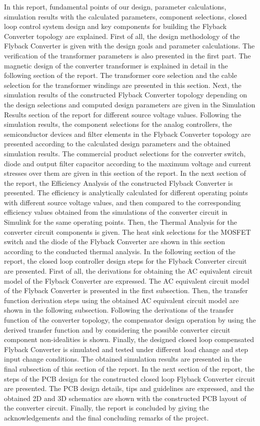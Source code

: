In this report, fundamental points of our design, parameter calculations, simulation results with the calculated parameters, component selections, closed loop control system design and key components for building the Flyback Converter topology are explained. First of all, the design methodology of the Flyback Converter is given with the design goals and parameter calculations. The verification of the transformer parameters is also presented in the first part. The magnetic design of the converter transformer is explained in detail in the following section of the report. The transformer core selection and the cable selection for the transformer windings are presented in this section. Next, the simulation results of the constructed Flyback Converter topology depending on the design selections and computed design parameters are given in the Simulation Results section of the report for different source voltage values. Following the simulation results, the component selections for the analog controllers, the semiconductor devices and filter elements in the Flyback Converter topology are presented according to the calculated design parameters and the obtained simulation results. The commercial product selections for the converter switch, diode and output filter capacitor according to the maximum voltage and current stresses over them are given in this section of the report. In the next section of the report, the Efficiency Analysis of the constructed Flyback Converter is presented. The efficiency is analytically calculated for different operating points with different source voltage values, and then compared to the corresponding efficiency values obtained from the simulations of the converter circuit in Simulink for the same operating points. Then, the Thermal Analysis for the converter circuit components is given. The heat sink selections for the MOSFET switch and the diode of the Flyback Converter are shown in this section according to the conducted thermal analysis. In the following section of the report, the closed loop controller design steps for the Flyback Converter circuit are presented. First of all, the derivations for obtaining the AC equivalent circuit model of the Flyback Converter are expressed. The AC equivalent circuit model of the Flyback Converter is presented in the first subsection. Then, the transfer function derivation steps using the obtained AC equivalent circuit model are shown in the following subsection. Following the derivations of the transfer function of the converter topology, the compensator design operation by using the derived transfer function and by considering the possible converter circuit component non-idealities is shown. Finally, the designed closed loop compensated Flyback Converter is simulated and tested under different load change and step input change conditions. The obtained simulation results are presented in the final subsection of this section of the report. In the next section of the report, the steps of the PCB design for the constructed closed loop Flyback Converter circuit are presented. The PCB design details, tips and guidelines are expressed, and the obtained 2D and 3D schematics are shown with the constructed PCB layout of the converter circuit. Finally, the report is concluded by giving the acknowledgements and the final concluding remarks of the project.

